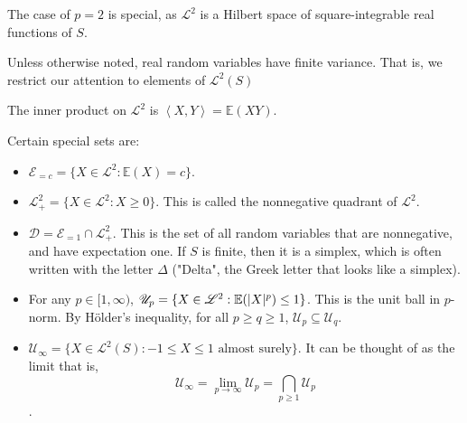 The case of $p=2$ is special, as \(\mathscr{L}^2\) is a Hilbert space of square-integrable real functions of $S$.
\begin{conv}
	Unless otherwise noted, real random variables have finite variance. That is, we restrict our attention to elements of $\mathscr{L}^2(S)$
\end{conv}

\begin{notn}
	The inner product on \(\mathscr{L}^2\) is \(\left<X, Y \right> = \mathbb{E}(XY)\).
\end{notn}

\begin{notn}\label{notn:subsets_of_l2}
Certain special sets are:
\begin{itemize}
	\item \(\mathscr{E}_{=c} = \{X \in \mathscr{L}^2 : \mathbb{E}(X) = c\} \).
	\item \(\mathscr{L}^2_+ = \{X \in \mathscr{L}^2 : X \ge 0\} \). This is called the nonnegative quadrant of \(\mathscr{L}^2\).
	\item \(\mathscr{D} = \mathscr{E}_{=1} \cap \mathscr{L}^2_+\). This is the set of all random variables that are nonnegative, and have expectation one. If \(S\) is finite, then it is a simplex, which is often written with the letter \(\Delta\) ("Delta", the Greek letter that looks like a simplex).
	\item For any $p \in [1, \infty)$, \(\mathscr{U}_p = \{X\in \mathscr{L}^2 : \mathbb{E}(|X|^p) \le 1\} \). This is the unit ball in \(p\)-norm. By H\"older's inequality, for all $p \ge q \ge 1$, $\mathscr{U}_p\subseteq \mathscr{U}_q$.
	\item \(\mathscr{U}_\infty = \{X \in \mathscr{L}^2(S ) : -1 \le X \le 1\text{ almost surely}\} \). It can be thought of as the limit that is, $$\mathscr{U}_\infty = \lim_{p\to\infty} \mathscr{U}_p = \bigcap_{p\ge 1}\mathscr{U}_p$$.
\end{itemize}
\end{notn}

